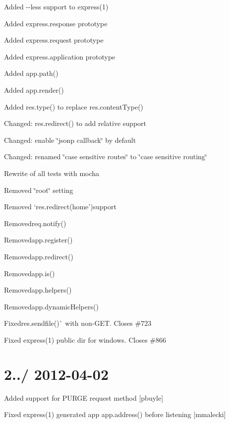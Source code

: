 {\begin{DoxyItemize}
\item Added {\ttfamily -\/-\/less} support to express(1)
\item Added {\ttfamily express.\+response} prototype
\item Added {\ttfamily express.\+request} prototype
\item Added {\ttfamily express.\+application} prototype
\item Added {\ttfamily app.\+path()}
\item Added {\ttfamily app.\+render()}
\item Added {\ttfamily res.\+type()} to replace {\ttfamily res.\+content\+Type()}
\item Changed\+: {\ttfamily res.\+redirect()} to add relative support
\item Changed\+: enable \char`\"{}jsonp callback\char`\"{} by default
\item Changed\+: renamed \char`\"{}case sensitive routes\char`\"{} to \char`\"{}case sensitive routing\char`\"{}
\item Rewrite of all tests with mocha
\item Removed \char`\"{}root\char`\"{} setting
\item Removed `res.\+redirect(\textquotesingle{}home'){\ttfamily support}
\item {\ttfamily Removed}req.\+notify(){\ttfamily }
\item {\ttfamily Removed}app.\+register(){\ttfamily }
\item {\ttfamily Removed}app.\+redirect(){\ttfamily }
\item {\ttfamily Removed}app.\+is(){\ttfamily }
\item {\ttfamily Removed}app.\+helpers(){\ttfamily }
\item {\ttfamily Removed}app.\+dynamic\+Helpers(){\ttfamily }
\item {\ttfamily Fixed}res.\+sendfile()\`{} with non-\/\+G\+ET. Closes \#723
\item Fixed express(1) public dir for windows. Closes \#866
\end{DoxyItemize}}

{\ttfamily \section*{2../ 2012-\/04-\/02 }}

{\ttfamily }

{\ttfamily 
\begin{DoxyItemize}
\item Added support for P\+U\+R\+GE request method \mbox{[}pbuyle\mbox{]}
\item Fixed {\ttfamily express(1)} generated app {\ttfamily app.\+address()} before {\ttfamily listening} \mbox{[}mmalecki\mbox{]}
\end{DoxyItemize}}

